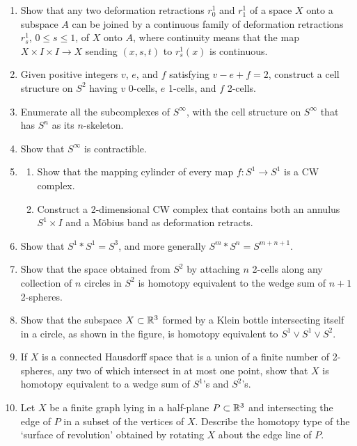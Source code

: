 \begin{enumerate}
\item Show that any two deformation retractions $r_0^1$ and $r_1^1$ of a space $X$
onto a subspace $A$ can be joined by a continuous family of deformation retractions
$r_s^1$, $0 \le s \le 1$, of $X$ onto $A$, where continuity means that the map
$X \times I \times I \to X$ sending $(x,s,t)$ to $r_s^1(x)$ is continuous.

\item Given positive integers $v$, $e$, and $f$ satisfying $v - e + f = 2$, construct a
cell structure on $S^2$ having $v$ 0-cells, $e$ 1-cells, and $f$ 2-cells.

\item Enumerate all the subcomplexes of $S^\infty$, with the cell structure on
$S^\infty$ that has $S^n$ as its $n$-skeleton.

\item Show that $S^\infty$ is contractible.

\item
\begin{enumerate}
\item[(a)] Show that the mapping cylinder of every map $f : S^1 \to S^1$ is a CW
complex.
\item[(b)] Construct a 2-dimensional CW complex that contains both an annulus
$S^1 \times I$ and a M\"obius band as deformation retracts.
\end{enumerate}

\item Show that $S^1 * S^1 = S^3$, and more generally $S^m * S^n = S^{m+n+1}$.

\item Show that the space obtained from $S^2$ by attaching $n$ 2-cells along any
collection of $n$ circles in $S^2$ is homotopy equivalent to the wedge sum of $n+1$
2-spheres.

\item Show that the subspace $X \subset \mathbb{R}^3$ formed by a Klein bottle intersecting
itself in a circle, as shown in the figure, is homotopy equivalent to
$S^1 \vee S^1 \vee S^2$.



\item If $X$ is a connected Hausdorff space that is a union of a finite number of
2-spheres, any two of which intersect in at most one point, show that $X$ is
homotopy equivalent to a wedge sum of $S^1$'s and $S^2$'s.

\item Let $X$ be a finite graph lying in a half-plane $P \subset \mathbb{R}^3$ and intersecting
the edge of $P$ in a subset of the vertices of $X$. Describe the homotopy type of the
`surface of revolution' obtained by rotating $X$ about the edge line of $P$.


\end{enumerate}
